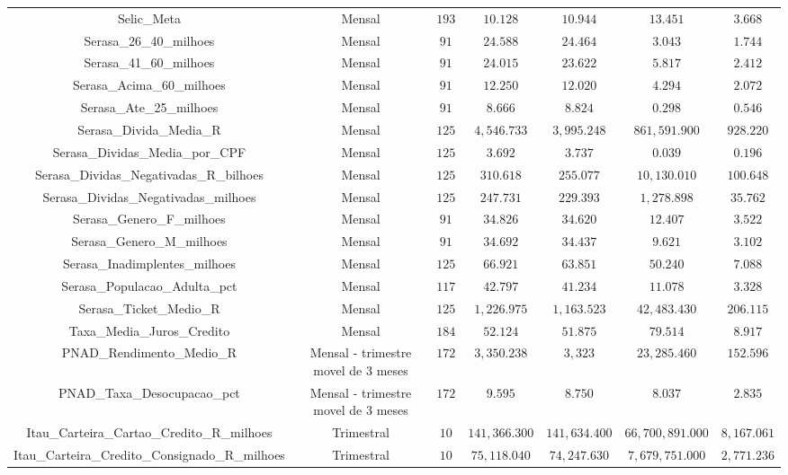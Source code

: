 \begin{table}[!htbp]
\begin{tabular}{@{\extracolsep{5pt}} ccccccc}
Selic\_Meta & Mensal & $193$ & $10.128$ & $10.944$ & $13.451$ & $3.668$ \\ 
Serasa\_26\_40\_milhoes & Mensal & $91$ & $24.588$ & $24.464$ & $3.043$ & $1.744$ \\ 
Serasa\_41\_60\_milhoes & Mensal & $91$ & $24.015$ & $23.622$ & $5.817$ & $2.412$ \\ 
Serasa\_Acima\_60\_milhoes & Mensal & $91$ & $12.250$ & $12.020$ & $4.294$ & $2.072$ \\ 
Serasa\_Ate\_25\_milhoes & Mensal & $91$ & $8.666$ & $8.824$ & $0.298$ & $0.546$ \\ 
Serasa\_Divida\_Media\_R & Mensal & $125$ & $4,546.733$ & $3,995.248$ & $861,591.900$ & $928.220$ \\ 
Serasa\_Dividas\_Media\_por\_CPF & Mensal & $125$ & $3.692$ & $3.737$ & $0.039$ & $0.196$ \\ 
Serasa\_Dividas\_Negativadas\_R\_bilhoes & Mensal & $125$ & $310.618$ & $255.077$ & $10,130.010$ & $100.648$ \\ 
Serasa\_Dividas\_Negativadas\_milhoes & Mensal & $125$ & $247.731$ & $229.393$ & $1,278.898$ & $35.762$ \\ 
Serasa\_Genero\_F\_milhoes & Mensal & $91$ & $34.826$ & $34.620$ & $12.407$ & $3.522$ \\ 
Serasa\_Genero\_M\_milhoes & Mensal & $91$ & $34.692$ & $34.437$ & $9.621$ & $3.102$ \\ 
Serasa\_Inadimplentes\_milhoes & Mensal & $125$ & $66.921$ & $63.851$ & $50.240$ & $7.088$ \\ 
Serasa\_Populacao\_Adulta\_pct & Mensal & $117$ & $42.797$ & $41.234$ & $11.078$ & $3.328$ \\ 
Serasa\_Ticket\_Medio\_R & Mensal & $125$ & $1,226.975$ & $1,163.523$ & $42,483.430$ & $206.115$ \\ 
Taxa\_Media\_Juros\_Credito & Mensal & $184$ & $52.124$ & $51.875$ & $79.514$ & $8.917$ \\ 
PNAD\_Rendimento\_Medio\_R & Mensal - trimestre movel de 3 meses & $172$ & $3,350.238$ & $3,323$ & $23,285.460$ & $152.596$ \\ 
PNAD\_Taxa\_Desocupacao\_pct & Mensal - trimestre movel de 3 meses & $172$ & $9.595$ & $8.750$ & $8.037$ & $2.835$ \\ 
Itau\_Carteira\_Cartao\_Credito\_R\_milhoes & Trimestral & $10$ & $141,366.300$ & $141,634.400$ & $66,700,891.000$ & $8,167.061$ \\ 
Itau\_Carteira\_Credito\_Consignado\_R\_milhoes & Trimestral & $10$ & $75,118.040$ & $74,247.630$ & $7,679,751.000$ & $2,771.236$ \\ 

\end{tabular}
\end{table}
